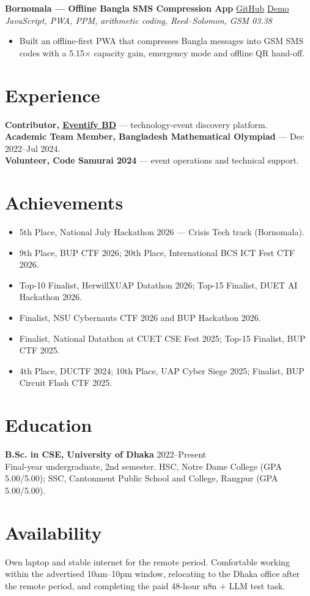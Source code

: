 \documentclass[10pt,a4paper]{article}
\newcommand{\project}[3]{\textbf{#1} \hfill {\small #2}\\{\small\textit{#3}}\par}
\begin{document}
\project{Bornomala --- Offline Bangla SMS Compression App}
{\href{https://github.com/Mayamoho/bornomala}{GitHub} \textbar{} \href{https://mayamoho.github.io/bornomala/}{Demo}}
{JavaScript, PWA, PPM, arithmetic coding, Reed--Solomon, GSM 03.38}
\begin{itemize}
\item Built an offline-first PWA that compresses Bangla messages into GSM SMS codes with a 5.15$\times$ capacity gain, emergency mode and offline QR hand-off.
\end{itemize}

\section{Experience}
\textbf{Contributor, \href{https://eventifybd.com/}{Eventify BD}} --- technology-event discovery platform.\\
\textbf{Academic Team Member, Bangladesh Mathematical Olympiad} --- Dec 2022--Jul 2024.\\
\textbf{Volunteer, Code Samurai 2024} --- event operations and technical support.

\section{Achievements}
\begin{itemize}
\item 5th Place, National July Hackathon 2026 --- Crisis Tech track (Bornomala).
\item 9th Place, BUP CTF 2026; 20th Place, International BCS ICT Fest CTF 2026.
\item Top-10 Finalist, HerwillXUAP Datathon 2026; Top-15 Finalist, DUET AI Hackathon 2026.
\item Finalist, NSU Cybernauts CTF 2026 and BUP Hackathon 2026.
\item Finalist, National Datathon at CUET CSE Fest 2025; Top-15 Finalist, BUP CTF 2025.
\item 4th Place, DUCTF 2024; 10th Place, UAP Cyber Siege 2025; Finalist, BUP Circuit Flash CTF 2025.
\end{itemize}

\section{Education}
\textbf{B.Sc. in CSE, University of Dhaka} \hfill 2022--Present\\
Final-year undergraduate, 2nd semester. HSC, Notre Dame College (GPA 5.00/5.00); SSC, Cantonment Public School and College, Rangpur (GPA 5.00/5.00).

\section{Availability}
Own laptop and stable internet for the remote period. Comfortable working within the advertised 10am--10pm window, relocating to the Dhaka office after the remote period, and completing the paid 48-hour n8n + LLM test task.
\end{document}
